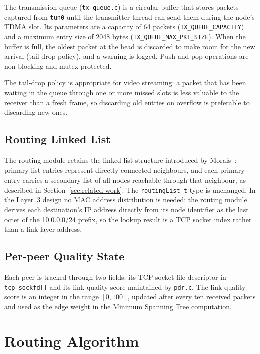 The transmission queue (\texttt{tx\_queue.c}) is a circular buffer that stores packets captured
from \texttt{tun0} until the transmitter thread can send them during the node's TDMA slot.
Its parameters are a capacity of 64 packets (\texttt{TX\_QUEUE\_CAPACITY}) and a maximum
entry size of 2048 bytes (\texttt{TX\_QUEUE\_MAX\_PKT\_SIZE}). When the buffer is full, the
oldest packet at the head is discarded to make room for the new arrival (tail-drop policy),
and a warning is logged. Push and pop operations are non-blocking and mutex-protected.

The tail-drop policy is appropriate for video streaming: a packet that has been waiting in
the queue through one or more missed slots is less valuable to the receiver than a fresh
frame, so discarding old entries on overflow is preferable to discarding new ones.

\subsection{Routing Linked List}

The routing module retains the linked-list structure introduced by
Morais~\cite{morais2024synchronization}: primary list entries represent directly connected
neighbours, and each primary entry carries a secondary list of all nodes reachable through
that neighbour, as described in Section~\ref{sec:related-work}. The \texttt{routingList\_t}
type is unchanged. In the Layer~3 design no MAC address distribution is needed: the routing module derives each
destination's IP address directly from its node identifier as the last octet of the
10.0.0.0/24 prefix, so the lookup result is a TCP socket index rather than a link-layer
address.

\subsection{Per-peer Quality State}

Each peer is tracked through two fields: its TCP socket file descriptor in
\texttt{tcp\_sockfd[]} and its link quality score maintained by \texttt{pdr.c}. The link
quality score is an integer in the range $[0, 100]$, updated after every ten received packets
and used as the edge weight in the Minimum Spanning Tree computation.


\section{Routing Algorithm}
\label{sec:routing-algo}

